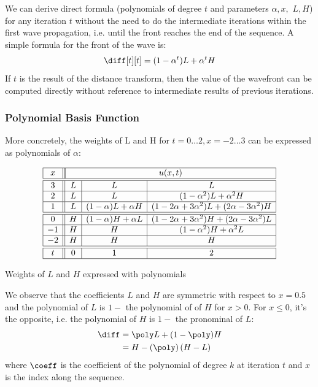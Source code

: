 We can derive direct formula (polynomials of degree $t$ and parameters $\alpha, x,$
$L, H$) for any iteration $t$ without the need to do the intermediate 
iterations within the first wave propagation, i.e. until the front reaches the end 
of the sequence. A simple formula for the front of the wave is:
%
\begin{equation}
    \diff[t][t] = (1 - \alpha^t)L + \alpha^t H
    \label{eq:wavefront}
\end{equation}
%
If $t$ is the result of the distance transform, then the value of the wavefront can be
computed directly without reference to intermediate results of previous iterations.

\subsubsection{Polynomial Basis Function}

More concretely, the weights of L and H for $t=0\ldots2,x=-2\ldots3$ can be expressed 
as polynomials of $\alpha$:

\begin{table}[ht]
    \small
    \centering
    $$
        \begin{array}{|c||c|c|c|} \hline
         x & \multicolumn{3}{|c|}{u(x,t)} \\ \hline \hline
         3 & L &          L           &                     L                       \\ \hline
         2 & L &          L           &         (1-\alpha^2)L+\alpha^2H             \\ \hline
         1 & L & (1-\alpha)L+\alpha H & (1-2\alpha+3\alpha^2)L+(2\alpha-3\alpha^2)H \\ \hline \hline
         0 & H & (1-\alpha)H+\alpha L & (1-2\alpha+3\alpha^2)H+(2\alpha-3\alpha^2)L \\ \hline
        -1 & H &          H           &         (1-\alpha^2)H+\alpha^2L             \\ \hline
        -2 & H &          H           &                     H                       \\ \hline \hline
        t  & 0 &          1           &                     2                       \\ \hline
        \end{array}
    $$
    \caption{Weights of $L$ and $H$ expressed with polynomials}
    \label{tab:weight_poly}
\end{table}

We observe that the coefficients $L$ and $H$ are symmetric with respect to $x=0.5$ and 
the polynomial of $L$ is $1-$ the polynomial of of $H$ for $x>0$. For $x\le0$, it's the 
opposite, i.e. the polynomial of $H$ is $1-$ the pronominal of $L$:
%
\begin{equation}
    \begin{split}
        \diff & = \poly L + (1 - \poly) H \\
              & = H - \left(\poly \right) (H-L)
    \end{split}
    \label{eq:polynomial}
\end{equation}
%
where $\coeff$ is the coefficient of the polynomial of degree $k$ at iteration $t$ and
$x$ is the index along the sequence.

